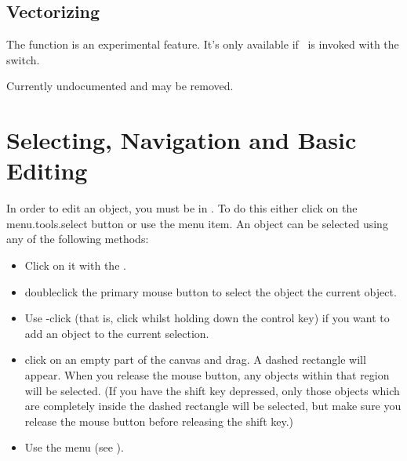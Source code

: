 
\section{Vectorizing}\label{sec:vectorize}

The  function is an experimental
feature. It's only available if \FlowframTk\ is invoked with
the  switch.

Currently undocumented and may be removed.


\chapter{Selecting, Navigation and Basic Editing}\label{sec:selectobjects}


In order to edit an \gls{object}, you must be in \selectmode. To do
this either click on the \gls{menu.tools.select} button or use the 
 menu item. An \gls*{object} can
be selected using any of the following methods:
\begin{itemize}
\item Click on it with the .

\item \Gls{doubleclick} the primary mouse button to
select the \gls*{object}  the current \gls*{object}.

\item Use -click (that is, \gls{click} whilst holding down the control
 key) if you want to add an \gls*{object} to the current
selection.

\item \Gls{click} on an empty part of the \gls{canvas} and
drag. A dashed rectangle will appear. When you release the mouse
button, any \glspl*{object} within that
region will be selected. (If you have the shift  key depressed,
only those objects which are completely inside the dashed
rectangle will be selected, but make sure you release the mouse
button before releasing the shift key.)

\item Use the  menu (see ).

\end{itemize}


